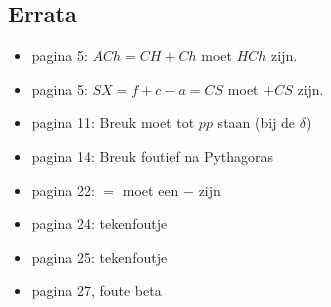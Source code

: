 \documentclass[10pt,a4paper]{article}
\begin{document}
\subsection*{Errata}

\begin{itemize}
	\item pagina 5: $ACh = CH+Ch$ moet $HCh$ zijn.
	\item pagina 5: $SX = f+c-a = CS$ moet $+CS$ zijn.
	\item pagina 11: Breuk moet tot $pp$ staan (bij de $\delta$)
	\item pagina 14: Breuk foutief na Pythagoras
	\item pagina 22: $=$ moet een $-$ zijn
	\item pagina 24: tekenfoutje
	\item pagina 25: tekenfoutje
	\item pagina 27, foute beta
\end{itemize} 
\end{document}
